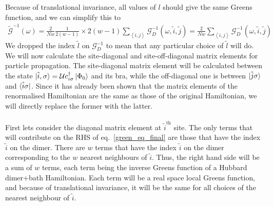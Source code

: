 \documentclass{article}
\numberwithin{equation}{section}
\begin{document}
Because of translational invariance, all values of \(l\) should give the same Greens function, and we can simplify this to
\begin{equation}\begin{aligned}
	\label{green_eq_final}
	\mathcal{\tilde G}^{-1}(\omega) = \frac{2}{Nw}\frac{1}{2(w-1)}\times 2(w-1)\sum_{\left<i,j\right>}\mathcal{G}_D^{-1}\left(\omega, \tilde i, \tilde j\right) = \frac{2}{Nw}\sum_{\left<i,j\right>}\mathcal{G}_D^{-1}\left(\omega, \tilde i, \tilde j\right)
\end{aligned}\end{equation}
We dropped the index \(\tilde l\) on \(\mathcal{G}_D^{-1}\) to mean that any particular choice of \(\tilde l\) will do. We will now calculate the site-diagonal and site-off-diagonal matrix elements for particle propagation. The site-diagonal matrix element will be calculated between the state $\ket{\tilde i, \sigma} = \mathcal{U}c^\dagger_{i\sigma}\ket{\Phi_0}$ and its bra, while the off-diagonal one is between $\ket{\tilde j\sigma}$ and $\bra{\tilde i\sigma}$. Since it has already been shown that the matrix elements of the renormalised Hamiltonian are the same as those of the original Hamiltonian, we will directly replace the former with the latter. \\\\
First lets consider the diagonal matrix element at $\tilde i^\text{th}$ site. The only terms that will contribute on the RHS of eq.~\ref{green_eq_final} are those that have the index $\tilde i$ on the dimer. There are $w$ terms that have the index \(\tilde i\) on the dimer corresponding to the $w$ nearest neighbours of \(\tilde i\). Thus, the right hand side will be a sum of $w$ terms, each term being the inverse Greens function of a Hubbard dimer+bath Hamiltonian. Each term will be a real space local Greens function, and because of translational invariance, it will be the same for all choices of the nearest neighbour of \(\tilde i\). %
\end{document}
